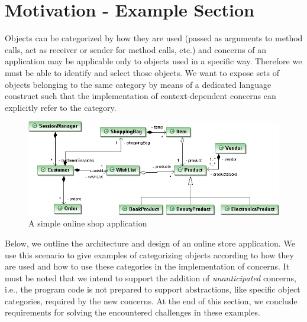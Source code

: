 \section{Motivation - Example Section}
\label{sect:motivation}

Objects can be categorized by how they are used (passed as arguments to method calls, act as receiver or sender for method calls, etc.) and concerns of an application may be applicable only to objects used in a specific way.
Therefore we must be able to identify and select those objects.
We want to expose sets of objects belonging to the same category by means of a dedicated language construct such that the implementation of context-dependent concerns can explicitly refer to the category.

\begin{figure}[h]
\includegraphics[width=\textwidth]{images/myonlineshop.png}%
\caption{A simple online shop application}%
\label{fig:shop}%
\end{figure}

Below, we outline the architecture and design of an online store application. We use this scenario to give examples of categorizing objects according to how they are used and how to use these categories in the implementation of concerns. It must be noted that we intend to support the addition of \emph{unanticipated} concerns, i.e., the program code is not prepared to support abstractions, like specific object categories, required by the new concerns.
At the end of this section, we conclude requirements for solving the encountered challenges in these examples.

